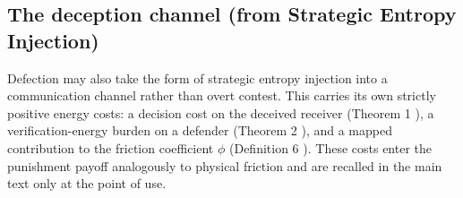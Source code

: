 \documentclass[11pt]{article}
\theoremstyle{plain}
\theoremstyle{definition}
\theoremstyle{remark}
\let\origsubsection\subsection
\renewcommand{\subsection}{\needspace{7\baselineskip}\origsubsection}
\begin{document}
\subsection{The deception channel (from Strategic Entropy
Injection)}\label{the-deception-channel-from-strategic-entropy-injection}

Defection may also take the form of strategic entropy injection into a
communication channel \citep{TC-II} rather than overt contest. This
carries its own strictly positive energy costs: a decision cost on the
deceived receiver (Theorem 1 \citep{TC-II}), a verification-energy
burden on a defender (Theorem 2 \citep{TC-II}), and a mapped
contribution to the friction coefficient \(\phi\) (Definition 6
\citep{TC-II}). These costs enter the punishment payoff analogously to
physical friction and are recalled in the main text only at the point of
use.
\end{document}
